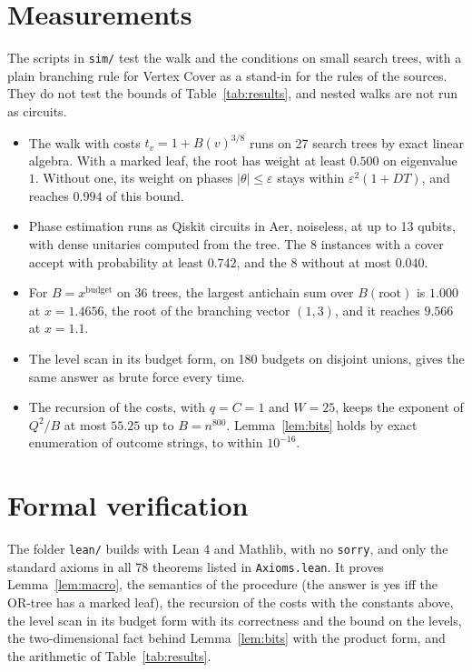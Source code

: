 \documentclass[11pt]{article}
\theoremstyle{definition}
\theoremstyle{remark}
\begin{document}
\section{Measurements}\label{sec:sim}

The scripts in \texttt{sim/} test the walk and the conditions on small search trees, with a plain branching rule for Vertex Cover as a stand-in for the rules of the sources. They do not test the bounds of Table~\ref{tab:results}, and nested walks are not run as circuits.
\begin{itemize}[leftmargin=1.5em]
\item The walk with costs $t_v=1+B(v)^{3/8}$ runs on 27 search trees by exact linear algebra. With a marked leaf, the root has weight at least $0.500$ on eigenvalue $1$. Without one, its weight on phases $|\theta|\le\varepsilon$ stays within $\varepsilon^2(1+DT)$, and reaches $0.994$ of this bound.
\item Phase estimation runs as Qiskit circuits in Aer, noiseless, at up to 13 qubits, with dense unitaries computed from the tree. The 8 instances with a cover accept with probability at least $0.742$, and the 8 without at most $0.040$.
\item For $B=x^{\text{budget}}$ on 36 trees, the largest antichain sum over $B(\text{root})$ is $1.000$ at $x=1.4656$, the root of the branching vector $(1,3)$, and it reaches $9.566$ at $x=1.1$.
\item The level scan in its budget form, on 180 budgets on disjoint unions, gives the same answer as brute force every time.
\item The recursion of the costs, with $q=C=1$ and $W=25$, keeps the exponent of $Q^2/B$ at most $55.25$ up to $B=n^{800}$. Lemma~\ref{lem:bits} holds by exact enumeration of outcome strings, to within $10^{-16}$.
\end{itemize}

\section{Formal verification}\label{sec:lean}

The folder \texttt{lean/} builds with Lean 4 and Mathlib, with no \texttt{sorry}, and only the standard axioms in all 78 theorems listed in \texttt{Axioms.lean}. It proves Lemma~\ref{lem:macro}, the semantics of the procedure (the answer is yes iff the OR-tree has a marked leaf), the recursion of the costs with the constants above, the level scan in its budget form with its correctness and the bound on the levels, the two-dimensional fact behind Lemma~\ref{lem:bits} with the product form, and the arithmetic of Table~\ref{tab:results}.
\end{document}
